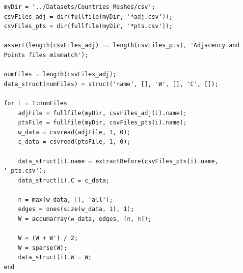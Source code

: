 \documentclass[unicode,11pt,a4paper,oneside,numbers=endperiod,openany]{scrartcl}
\begin{document}
\begin{lstlisting}[language=MyMATLAB, style=mystyle, caption={Processing CSV Files into a Data Structure}]
    myDir = '../Datasets/Countries_Meshes/csv';
csvFiles_adj = dir(fullfile(myDir, '*adj.csv'));
csvFiles_pts = dir(fullfile(myDir, '*pts.csv'));

assert(length(csvFiles_adj) == length(csvFiles_pts), 'Adjacency and Points files mismatch');

numFiles = length(csvFiles_adj);
data_struct(numFiles) = struct('name', [], 'W', [], 'C', []);

for i = 1:numFiles
    adjFile = fullfile(myDir, csvFiles_adj(i).name);
    ptsFile = fullfile(myDir, csvFiles_pts(i).name);
    w_data = csvread(adjFile, 1, 0);
    c_data = csvread(ptsFile, 1, 0);
    
    data_struct(i).name = extractBefore(csvFiles_pts(i).name, '_pts.csv');
    data_struct(i).C = c_data;

    n = max(w_data, [], 'all');
    edges = ones(size(w_data, 1), 1);
    W = accumarray(w_data, edges, [n, n]);

    W = (W + W') / 2;  
    W = sparse(W);
    data_struct(i).W = W;
end
\end{lstlisting}
\end{document}
